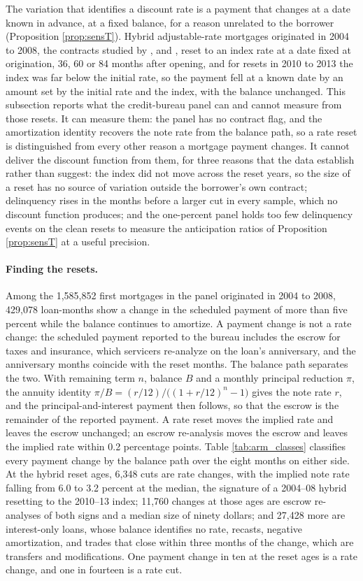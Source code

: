The variation that identifies a discount rate is a payment that changes at a date known in advance, at a fixed balance, for a reason unrelated to the borrower (Proposition \ref{prop:sensT}). Hybrid adjustable-rate mortgages originated in 2004 to 2008, the contracts studied by \citet{fuster_payment_2017}, \citet{keys_mortgage_2014} and \citet{dimaggio_interest_2017}, reset to an index rate at a date fixed at origination, 36, 60 or 84 months after opening, and for resets in 2010 to 2013 the index was far below the initial rate, so the payment fell at a known date by an amount set by the initial rate and the index, with the balance unchanged. This subsection reports what the credit-bureau panel can and cannot measure from those resets. It can measure them: the panel has no contract flag, and the amortization identity recovers the note rate from the balance path, so a rate reset is distinguished from every other reason a mortgage payment changes. It cannot deliver the discount function from them, for three reasons that the data establish rather than suggest: the index did not move across the reset years, so the size of a reset has no source of variation outside the borrower's own contract; delinquency rises in the months before a larger cut in every sample, which no discount function produces; and the one-percent panel holds too few delinquency events on the clean resets to measure the anticipation ratios of Proposition \ref{prop:sensT} at a useful precision.

\paragraph{Finding the resets.} Among the 1,585,852 first mortgages in the panel originated in 2004 to 2008, 429,078 loan-months show a change in the scheduled payment of more than five percent while the balance continues to amortize. A payment change is not a rate change: the scheduled payment reported to the bureau includes the escrow for taxes and insurance, which servicers re-analyze on the loan's anniversary, and the anniversary months coincide with the reset months. The balance path separates the two. With remaining term $n$, balance $B$ and a monthly principal reduction $\pi$, the annuity identity $\pi/B=(r/12)/\big((1+r/12)^{n}-1\big)$ gives the note rate $r$, and the principal-and-interest payment then follows, so that the escrow is the remainder of the reported payment. A rate reset moves the implied rate and leaves the escrow unchanged; an escrow re-analysis moves the escrow and leaves the implied rate within 0.2 percentage points. Table \ref{tab:arm_classes} classifies every payment change by the balance path over the eight months on either side. At the hybrid reset ages, 6,348 cuts are rate changes, with the implied note rate falling from 6.0 to 3.2 percent at the median, the signature of a 2004--08 hybrid resetting to the 2010--13 index; 11,760 changes at those ages are escrow re-analyses of both signs and a median size of ninety dollars; and 27,428 more are interest-only loans, whose balance identifies no rate, recasts, negative amortization, and trades that close within three months of the change, which are transfers and modifications. One payment change in ten at the reset ages is a rate change, and one in fourteen is a rate cut.

